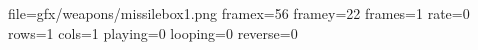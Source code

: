 file=gfx/weapons/missilebox1.png
framex=56
framey=22
frames=1
rate=0
rows=1
cols=1
playing=0
looping=0
reverse=0
